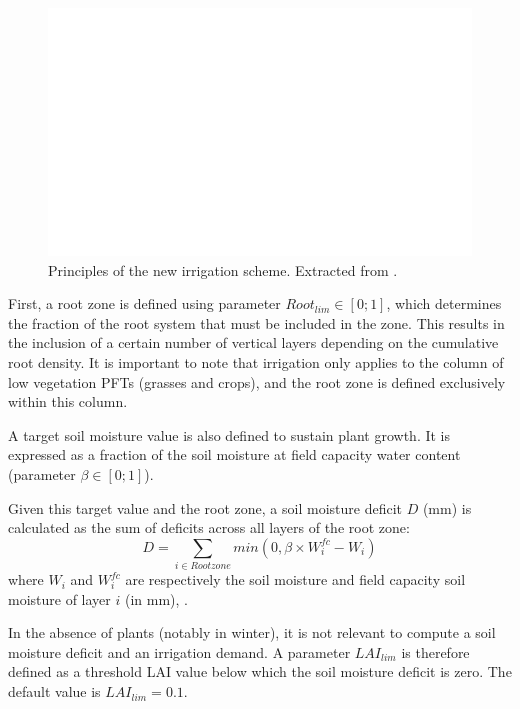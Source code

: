 \begin{figure}[t]
    \centering
    \includegraphics[width=1\textwidth]{images/schema_pedro.png}
    \caption{Principles of the new irrigation scheme. Extracted from \citet{arboleda-obando_validation_2024}.}
    \label{fig:schema_pedro}
\end{figure}

First, a root zone is defined using parameter $Root_{lim} \in [0;1]$, which determines the fraction of the root system that must be included in the zone. This results in the inclusion of a certain number of vertical layers depending on the cumulative root density. It is important to note that irrigation only applies to the column of low vegetation PFTs (grasses and crops), and the root zone is defined exclusively within this column.

A target soil moisture value is also defined to sustain plant growth. It is expressed as a fraction of the soil moisture at field capacity water content (parameter $\beta \in [0;1]$).

Given this target value and the root zone, a soil moisture deficit $D$ (mm) is calculated as the sum of deficits across all layers of the root zone:
\begin{equation}
    D = \sum_{i \in Rootzone} min(0,\beta \times W_i^{fc} - W_i)
\end{equation}
where $W_i$ and $W_i^{fc}$ are respectively the soil moisture and field capacity soil moisture of layer $i$ (in mm), .

In the absence of plants (notably in winter), it is not relevant to compute a soil moisture deficit and an irrigation demand. A parameter $LAI_{lim}$ is therefore defined as a threshold LAI value below which the soil moisture deficit is zero. The default value is $LAI_{lim}=0.1$.

